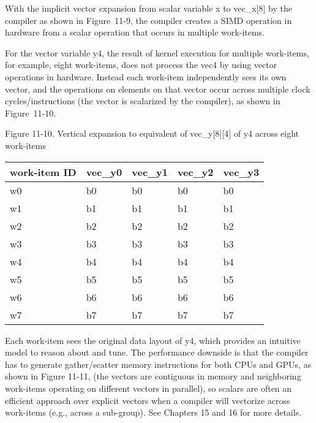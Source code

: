 With the implicit vector expansion from scalar variable x to vec\_x[8] by the compiler as shown in Figure 11-9, the compiler creates a SIMD operation in hardware from a scalar operation that occurs in multiple work-items.\par

For the vector variable y4, the result of kernel execution for multiple work-items, for example, eight work-items, does not process the vec4 by using vector operations in hardware. Instead each work-item independently sees its own vector, and the operations on elements on that vector occur across multiple clock cycles/instructions (the vector is scalarized by the compiler), as shown in Figure 11-10.\par

\hspace*{\fill} \par %
Figure 11-10. Vertical expansion to equivalent of vec\_y[8][4] of y4 across eight work-items
\begin{table}[]
	\begin{tabular}{|l|l|l|l|l|}
		\hline
		work-item ID & vec\_y0 & vec\_y1 & vec\_y2 & vec\_y3 \\ \hline
		w0           & b0      & b0      & b0      & b0      \\ \hline
		w1           & b1      & b1      & b1      & b1      \\ \hline
		w2           & b2      & b2      & b2      & b2      \\ \hline
		w3           & b3      & b3      & b3      & b3      \\ \hline
		w4           & b4      & b4      & b4      & b4      \\ \hline
		w5           & b5      & b5      & b5      & b5      \\ \hline
		w6           & b6      & b6      & b6      & b6      \\ \hline
		w7           & b7      & b7      & b7      & b7      \\ \hline
	\end{tabular}
\end{table}

Each work-item sees the original data layout of y4, which provides an intuitive model to reason about and tune. The performance downside is that the compiler has to generate gather/scatter memory instructions for both CPUs and GPUs, as shown in Figure 11-11, (the vectors are contiguous in memory and neighboring work-items operating on different vectors in parallel), so scalars are often an efficient approach over explicit vectors when a compiler will vectorize across work-items (e.g., across a sub-group). See Chapters 15 and 16 for more details.\par

